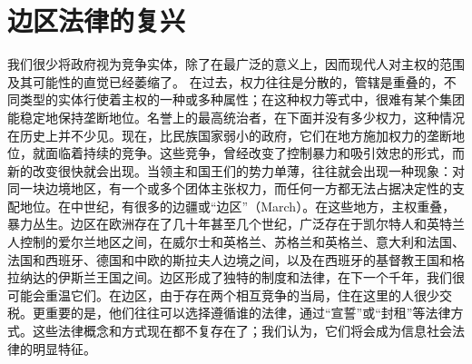 \section{边区法律的复兴}
\begin{paracol}{2}
我们很少将政府视为竞争实体，除了在最广泛的意义上，因而现代人对主权的范围及其可能性的直觉已经萎缩了。 在过去，权力往往是分散的，管辖是重叠的，不同类型的实体行使着主权的一种或多种属性；在这种权力等式中，很难有某个集团能稳定地保持垄断地位。名誉上的最高统治者，在下面并没有多少权力，这种情况在历史上并不少见。现在，比民族国家弱小的政府，它们在地方施加权力的垄断地位，就面临着持续的竞争。这些竞争，曾经改变了控制暴力和吸引效忠的形式，而新的改变很快就会出现。当领主和国王们的势力单薄，往往就会出现一种现象：对同一块边境地区，有一个或多个团体主张权力，而任何一方都无法占据决定性的支配地位。在中世纪，有很多的边疆或“边区”（March）。在这些地方，主权重叠，暴力丛生。边区在欧洲存在了几十年甚至几个世纪，广泛存在于凯尔特人和英特兰人控制的爱尔兰地区之间，在威尔士和英格兰、苏格兰和英格兰、意大利和法国、法国和西班牙、德国和中欧的斯拉夫人边境之间，以及在西班牙的基督教王国和格拉纳达的伊斯兰王国之间。边区形成了独特的制度和法律，在下一个千年，我们很可能会重温它们。在边区，由于存在两个相互竞争的当局，住在这里的人很少交税。更重要的是，他们往往可以选择遵循谁的法律，通过“宣誓”或“封租”等法律方式。这些法律概念和方式现在都不复存在了；我们认为，它们将会成为信息社会法律的明显特征。


\end{paracol}
